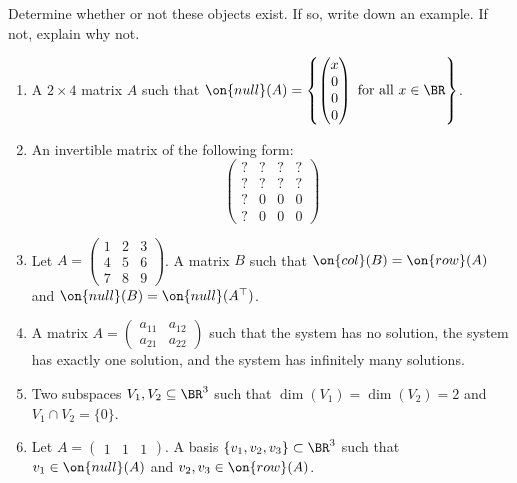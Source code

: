 \documentclass[10pt]{amsart}
\theoremstyle{mythm}
\theoremstyle{definition}
\theoremstyle{myrmk}
\newcounter{part-count}
\newenvironment{me}[1]{\begin{enumerate}[#1]\setcounter{enumi}{\value{part-count}}}{\setcounter{part-count}{\value{enumi}}\end{enumerate}}
\begin{document}
	\thispagestyle{fancy}
	
	\noindent Determine whether or not these objects exist. If so, write down an example. If not, explain why not. 
	
	\begin{me}{itemsep = 0.2cm}
		\item A $2 \times 4$ matrix $A$ such that $\on{null}(A) = \left\{ \begin{pmatrix}
		x \\ 0 \\ 0 \\ 0 
		\end{pmatrix} \text{ for all } x \in \BR\right\}$. 
		\item An invertible matrix of the following form: 
		\[
		\begin{pmatrix}
			? & ? & ? & ? \\ 
			? & ? & ? & ? \\
			? & 0 & 0 & 0 \\
			? & 0 & 0 & 0
		\end{pmatrix}
		\]
		\item Let $A = \begin{pmatrix}
		1 & 2 & 3 \\ 4 & 5 & 6 \\ 7 & 8 & 9 
		\end{pmatrix}$. A matrix $B$ such that $\on{col}(B) = \on{row}(A)$ and $\on{null}(B) = \on{null}(A^\top)$. 
		\item A matrix $A = \begin{pmatrix}
			a_{11} & a_{12} \\ a_{21} & a_{22} 
		\end{pmatrix}$ such that the system 
		has no solution, the system 
		has exactly one solution, and the system 
		has infinitely many solutions. 
		\item Two subspaces $V_1, V_2 \subseteq \BR^3$ such that $\dim(V_1) = \dim(V_2) = 2$ and $V_1 \cap V_2 = \{0\}$. 
		\item Let $A = \begin{pmatrix}
		1 & 1 & 1
		\end{pmatrix}$. A basis $\{v_1, v_2, v_3\} \subset \BR^3$ such that $v_1 \in \on{null}(A)$ and $v_2, v_3 \in \on{row}(A)$. 

\end{me}
\end{document}
